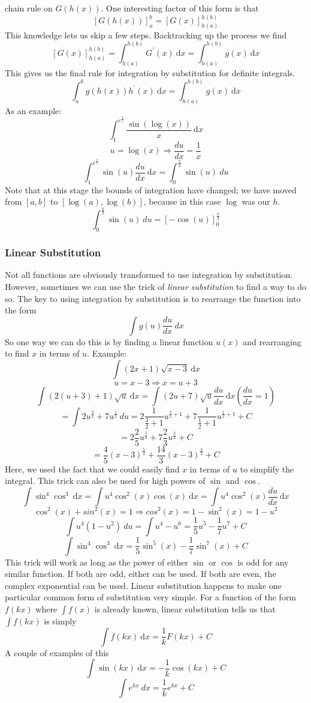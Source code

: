 \documentclass[12pt]{report}
\newcommand{\dx}{\:\mathrm{d}x}
\begin{document}
\begin{flushleft}
chain rule on \(G(h(x))\). One interesting factor of this form is that
\[\left[G(h(x))\right]_a^b = \left[G(x)\right]_{h(a)}^{h(b)}\]
This knowledge lets us skip a few steps. Backtracking up the process we find
\[\left[G(x)\right]_{h(a)}^{h(b)} = \int_{h(a)}^{h(b)}G^\prime(x) \dx
= \int_{h(a)}^{h(b)}g(x) \dx\]
This gives us the final rule for integration by substitution for definite 
integrals.
\[\int_a^b g(h(x))h^\prime(x) \dx = \int_{h(a)}^{h(b)} g(x) \dx\]
As an example:
\[\int_1^{e^\frac{\pi}{2}} \frac{\sin(\log(x))}{x} \dx\]
\[u = \log(x) \Rightarrow \frac{du}{dx} = \frac{1}{x}\]
\[\int_1^{e^\frac{\pi}{2}} \sin(u)\frac{du}{dx} \dx = 
\int_0^\frac{\pi}{2} \sin(u) \:du\]
Note that at this stage the bounds of integration have changed; we have moved
from \([a, b]\) to \([\log(a), \log(b)]\), because in this case \(\log\) was 
our \(h\).
\[\int_0^\frac{\pi}{2} \sin(u) \:du = \left[-\cos(u)\right]_0^\frac{\pi}{2}\] 

\subsubsection*{Linear Substitution}
Not all functions are obviously transformed to use integration by substitution.
However, sometimes we can use the trick of \textit{linear substitution} to find
a way to do so. The key to using integration by substitution is to rearrange
the function into the form
\[\int g(u) \frac{du}{dx} \: dx\]
So one way we can do this is by finding a linear function \(u(x)\) and 
rearranging to find \(x\) in terms of \(u\). Example:
\[\int (2x + 1)\sqrt{x - 3} \dx\]
\[u = x - 3 \Rightarrow x = u + 3\]
\[\int (2(u + 3) + 1)\sqrt{u} \dx = \int (2u + 7)\sqrt{u}\frac{du}{dx} \dx
\left(\frac{du}{dx} = 1\right)\]
\[= \int 2u^{\frac{3}{2}} + 7u^{\frac{1}{2}} \:du = 
2\frac{1}{\frac{3}{2} + 1}u^{\frac{3}{2} + 1} + 
7\frac{1}{\frac{1}{2} + 1}u^{\frac{1}{2} + 1} + C\]
\[= 2\frac{2}{5}u^\frac{5}{2} + 7\frac{2}{3}u^\frac{3}{2} + C\]
\[= \frac{4}{5}(x - 3)^\frac{5}{2} + \frac{14}{3}(x - 3)^\frac{3}{2} + C\]
Here, we used the fact that we could easily find \(x\) in terms of \(u\) to
simplify the integral. This trick can also be used for high powers of \(\sin\)
and \(\cos\).
\[\int \sin^4\cos^3 \dx = \int u^4\cos^2(x)\cos(x) \dx = 
\int u^4\cos^2(x)\frac{du}{dx} \dx\]
\[\cos^2(x) + sin^2(x) = 1 \Rightarrow cos^2(x) = 1 - \sin^2(x) = 1 - u^2\]
\[\int u^4(1 - u^2) \:du = \int u^4 - u^6 = 
\frac{1}{5}u^5 - \frac{1}{7}u^7 + C\]
\[\int \sin^4\cos^3 \dx = \frac{1}{5}\sin^5(x) - \frac{1}{7}\sin^7(x) + C\]
This trick will work as long as the power of either \(\sin\) or \(\cos\) is odd
for any similar function. If both are odd, either can be used. If both are 
even, the complex exponential can be used.
\bigskip
Linear substitution happens to make one particular common form of substitution 
very simple. For a function of the form \(f(kx)\) where \(\int f(x)\) is 
already known, linear substitution tells us that \(\int f(kx)\) is simply
\[\int f(kx) \dx = \frac{1}{k}F(kx) + C\]
A couple of examples of this
\[\int \sin(kx) \dx = -\frac{1}{k}\cos(kx) + C\]
\[\int e^{kx} \: dx = \frac{1}{k}e^{kx} + C\]


\end{flushleft}
\end{document}
